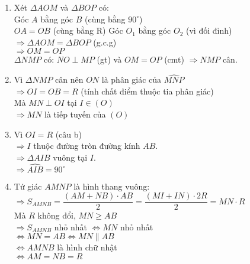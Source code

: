 \begin{ex}
{\begin{center}
\end{center}
    \begin{enumerate}
        \item Xét $\Delta AOM$ và $\Delta BOP$ có:\\
        Góc $A$ bằng góc $B$ (cùng bằng $90^\circ$)\\
        $OA=OB$ (cùng bằng R)
        Góc $O_1$ bằng góc $O_2$ (vì đối đỉnh)\\
        $\Rightarrow \Delta AOM = \Delta BOP$ (g.c.g)\\
        $\Rightarrow OM = OP$\\
        $\Delta NMP$ có: $NO \perp MP$ (gt) và $OM=OP$ (cmt) $\Rightarrow NMP$ cân.
        \item Vì $\Delta NMP$ cân nên $ON$ là phân giác của $\widehat{MNP}$\\
        $\Rightarrow OI=OB=R$ (tính chất điểm thuộc tia phân giác)\\
        Mà $MN \perp OI$ tại $I \in (O)$\\
        $\Rightarrow MN$ là tiếp tuyến của $(O)$
        \item Vì $OI=R$ (câu b)\\
        $\Rightarrow I$ thuộc đường tròn đường kính $AB$.\\
        $\Rightarrow \Delta AIB$ vuông tại $I$.\\
        $\Rightarrow \widehat{AIB}=90^\circ$
        \item Tứ giác $AMNP$ là hình thang vuông:\\
        $\Rightarrow S_{AMNB}=\dfrac{(AM+NB)\cdot AB}{2}=\dfrac{(MI+IN)\cdot 2R}{2}=MN \cdot R$\\
        Mà $R$ không đổi, $MN \geq AB$\\
        $\Rightarrow S_{AMNB}$ nhỏ nhất $\Leftrightarrow MN$ nhỏ nhất\\
        $\Leftrightarrow MN=AB \Leftrightarrow MN \parallel AB$\\
        $\Leftrightarrow AMNB$ là hình chữ nhật\\
        $\Leftrightarrow AM=NB=R$ 
    \end{enumerate}
}
\end{ex}

